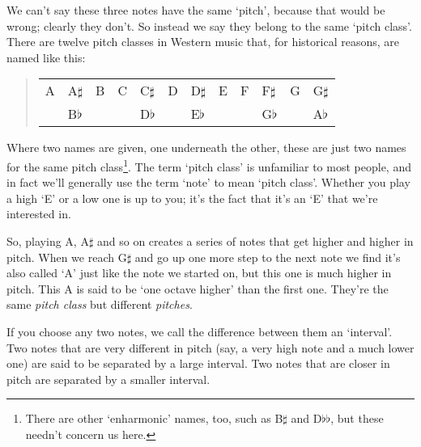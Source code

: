\documentclass[english]{./gbook}
\begin{document}
\begin{large}
We can't say these three notes have the same `pitch', because that would be wrong; clearly they don't. So instead we say they belong to the same `pitch class'. There are twelve pitch classes in Western music that, for historical reasons, are named like this:
\begin{quote}
\begin{tabular}{llllllllllll}
	A & A$\sharp$ & B & C & C$\sharp$ & D & D$\sharp$ & E & F & F$\sharp$ & G & G$\sharp$ \\
	  & B$\flat$  &   &   & D$\flat$  &   & E$\flat$  &   &   & G$\flat$  &   & A$\flat$
\end{tabular}
\end{quote}
Where two names are given, one underneath the other, these are just two names for the same pitch class\footnote{There are other `enharmonic' names, too, such as B$\sharp$ and D$\flat\flat$, but these needn't concern us here.}. The term `pitch class' is unfamiliar to most people, and in fact we'll generally use the term `note' to mean `pitch class'. Whether you play a high `E' or a low one is up to you; it's the fact that it's an `E' that we're interested in.

So, playing A, A$\sharp$ and so on creates a series of notes that get higher and higher in pitch. When we reach G$\sharp$ and go up one more step to the next note we find it's also called `A' just like the note we started on, but this one is much higher in pitch. This A is said to be `one octave higher' than the first one. They're the same \emph{pitch class} but different \emph{pitches}.

If you choose any two notes, we call the difference between them an `interval'. Two notes that are very different in pitch (say, a very high note and a much lower one) are said to be separated by a large interval. Two notes that are closer in pitch are separated by a smaller interval.


\end{large}
\end{document}
